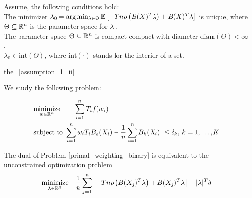 \begin{asu}
  \label{assumption_1}
  Assume, the following conditions hold:
  \\
  \subasu 
  \label{assumption_1_i} 
  The minimizer 
  $
  \lambda_0 
  =
  \arg \min_{\lambda \in \Theta}
  \mathbb{E}
  \left[ 
    -T n 
    \rho 
    \left( 
    B(X)^T \lambda
    \right)
    +
    B(X)^T \lambda
  \right]
  $
  is unique,
  where 
  $\Theta \subseteq \mathbb{R}^n$ is the parameter space for $\lambda$
  .
  \\
  \subasu 
  \label{assumption_1_ii} 
  The parameter space 
  $\Theta \subseteq \mathbb{R}^n$
  is compact compact with diameter
  $\text{diam}(\Theta) < \infty$
  .
  \\
  \subasu 
  \label{assumption_1_iii}
  $\lambda_0 \in \text{int}(\Theta)$,
  where
  $\text{int}(\cdot)$
  stands for the interior of a set.
\end{asu}


the ~\ref{assumption_1_ii}

We study the following problem:

\begin{align}
  \label{primal_weighting_binary}
  \begin{split}
  &\underset{w \in \mathbb{R}^n}{\text{minimize}}
  \qquad
  \sum_{i = 1}^{n} T_i f(w_i)
  \\
  &\text{subject to}
  \left| 
    \sum_{i = 1}^{n} w_i T_i B_k(X_i)
    - 
    \frac{1}{n} \sum_{i = 1}^{n} B_k(X_i)
  \right|
  \le 
  \delta_k,\,
  k = 1, \ldots, K
  \end{split}
\end{align}


\begin{proposition}
  The dual of Problem \eqref{primal_weighting_binary} is equivalent to the unconstrained optimization problem
  \begin{gather}
    \label{dual_weighting_binary}
      \underset{\lambda \in \mathbb{R}^K}{\text{minimize}}
      \quad
      \frac{1}{n}
      \sum_{j = 1}^{n} 
      \left[ 
        -T n 
        \rho 
        \left( 
          B(X_j)^T \lambda
        \right)
      +
      B(X_j)^T \lambda
      \right]
      +
      |\lambda|^T \delta
  \end{gather}
\end{proposition}
